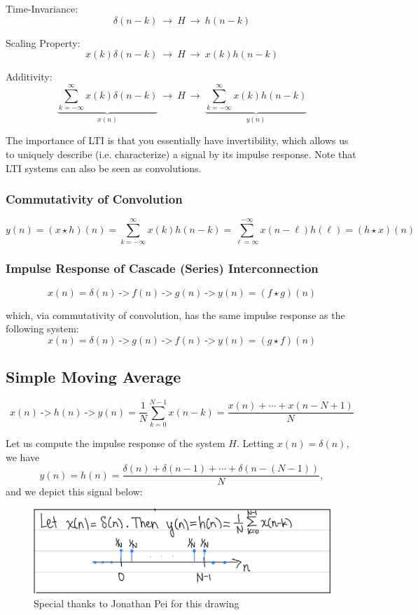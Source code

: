     Time-Invariance:
    \[
        \delta(n-k) \ \rightarrow \ \boxed{H} \ \rightarrow \  h(n-k)
    \]
    
    Scaling Property:
    \[
        x(k)\delta(n-k) \ \rightarrow \ \boxed{H} \ \rightarrow \  x(k)h(n-k)
    \]
    
    Additivity:
    \[
        \underbrace{\sum_{k=-\infty}^\infty x(k)\delta(n-k)}_{x(n)} \ \rightarrow \ \boxed{H} \ \rightarrow \  \underbrace{\sum_{k=-\infty}^\infty x(k)h(n-k)}_{y(n)}
    \]
    
    The importance of LTI is that you essentially have invertibility, which allows us to uniquely describe (i.e. characterize) a signal by its impulse response. Note that LTI systems can also be seen as convolutions.

\subsubsection{Commutativity of Convolution}
\begin{shaded}
    \[
        y(n) = (x\star h)(n)=\sum_{k=-\infty}^\infty x(k)h(n-k) = \sum_{\ell = \infty}^{-\infty} x(n - \ell) h(\ell)
        = (h\star x)(n)
    \]
\end{shaded}
    
\subsubsection{Impulse Response of Cascade (Series) Interconnection}
    \[
        x(n)=\delta(n) \ \texttt{->} \ \boxed{f(n)} \ \texttt{->} \ \boxed{g(n)} \ \texttt{->} \  y(n)=(f\star g)(n)
    \]
    
which, via commutativity of convolution, has the same impulse response as the following system:
\[
        x(n)=\delta(n) \ \texttt{->} \ \boxed{g(n)} \ \texttt{->} \ \boxed{f(n)} \ \texttt{->} \  y(n)=(g\star f)(n)
    \]


\subsection{Simple Moving Average}
\[
    x(n) \ \texttt{->} \ \boxed{h(n)} \ \texttt{->} \  y(n)=\frac1N\sum_{k=0}^{N-1} x(n-k)=\frac{x(n)+\cdots+x(n-N+1)}{N}
\]

Let us compute the impulse response of the system $H$. Letting $x(n)=\delta(n),$ we have \[y(n)=h(n)=\frac{\delta(n)+\delta(n-1)+\cdots+\delta(n-(N-1))}{N},\]
and we depict this signal below:
\begin{figure}[h]
    \centering
    \includegraphics[scale=0.25]{lectures/img/Lec2_SimpleMovingAverage.png}
    \caption{Special thanks to Jonathan Pei for this drawing}
    \label{fig:simple_moving_average}
\end{figure}
